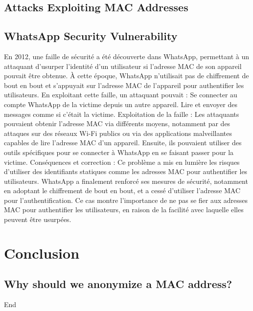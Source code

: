 \documentclass[aps,prb,twocolumn,superscriptaddress,floatfix,longbibliography,nofootinbib]{revtex4-2}
\begin{document}
  \subsection{\label{subsec: Attacks}Attacks Exploiting MAC Addresses}
  \subsection{\label{subsec:WhatsApp}WhatsApp Security Vulnerability}

En 2012, une faille de sécurité a été découverte dans WhatsApp, permettant à un attaquant d'usurper l'identité d'un utilisateur si l'adresse MAC de son appareil pouvait être obtenue. À cette époque, WhatsApp n’utilisait pas de chiffrement de bout en bout et s’appuyait sur l’adresse MAC de l’appareil pour authentifier les utilisateurs. En exploitant cette faille, un attaquant pouvait :
    Se connecter au compte WhatsApp de la victime depuis un autre appareil.
    Lire et envoyer des messages comme si c’était la victime.
Exploitation de la faille :
Les attaquants pouvaient obtenir l'adresse MAC via différents moyens, notamment par des attaques sur des réseaux Wi-Fi publics ou via des applications malveillantes capables de lire l'adresse MAC d'un appareil. Ensuite, ils pouvaient utiliser des outils spécifiques pour se connecter à WhatsApp en se faisant passer pour la victime.
Conséquences et correction :
Ce problème a mis en lumière les risques d'utiliser des identifiants statiques comme les adresses MAC pour authentifier les utilisateurs. WhatsApp a finalement renforcé ses mesures de sécurité, notamment en adoptant le chiffrement de bout en bout, et a cessé d’utiliser l’adresse MAC pour l’authentification.
Ce cas montre l'importance de ne pas se fier aux adresses MAC pour authentifier les utilisateurs, en raison de la facilité avec laquelle elles peuvent être usurpées.




\section{\label{sec:Conclusion}Conclusion}
  \subsection{\label{sec:Why}Why should we anonymize a MAC address?}

End



\end{document}
